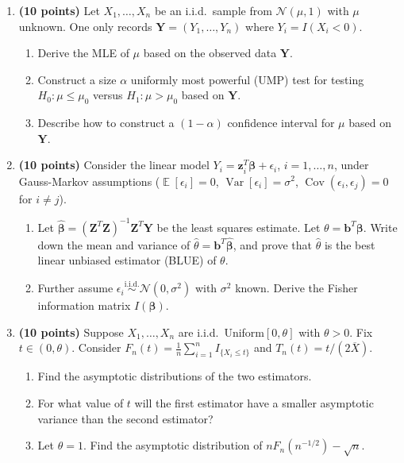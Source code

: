 \documentclass[11pt,a4paper]{article}
\DeclareMathOperator{\Var}{Var}
\DeclareMathOperator{\E}{\mathbb{E}}
\DeclareMathOperator{\Cov}{Cov}
\begin{document}
\begin{enumerate}[label=\textbf{\arabic*.}]
    \item \textbf{(10 points)} Let $X_1, \dots, X_n$ be an i.i.d.\ sample from $\mathcal{N}(\mu, 1)$ with $\mu$ unknown. One only records $\mathbf{Y} = (Y_1, \dots, Y_n)$ where $Y_i = I(X_i < 0)$.
    \begin{enumerate}[label=(\alph*)]
        \item Derive the MLE of $\mu$ based on the observed data $\mathbf{Y}$.
        \item Construct a size $\alpha$ uniformly most powerful (UMP) test for testing $H_0 : \mu \le \mu_0$ versus $H_1 : \mu > \mu_0$ based on $\mathbf{Y}$.
        \item Describe how to construct a $(1 - \alpha)$ confidence interval for $\mu$ based on $\mathbf{Y}$.
    \end{enumerate}

    \item \textbf{(10 points)} Consider the linear model $Y_i = \mathbf{z}_i^T \bm{\beta} + \epsilon_i$, $i = 1, \dots, n$, under Gauss-Markov assumptions ($\E[\epsilon_i] = 0$, $\Var[\epsilon_i] = \sigma^2$, $\Cov(\epsilon_i, \epsilon_j) = 0$ for $i \neq j$).
    \begin{enumerate}[label=(\alph*)]
        \item Let $\hat{\bm{\beta}} = (\mathbf{Z}^T \mathbf{Z})^{-1} \mathbf{Z}^T \mathbf{Y}$ be the least squares estimate. Let $\theta = \mathbf{b}^T \bm{\beta}$. Write down the mean and variance of $\hat{\theta} = \mathbf{b}^T \hat{\bm{\beta}}$, and prove that $\hat{\theta}$ is the best linear unbiased estimator (BLUE) of $\theta$.
        \item Further assume $\epsilon_i \stackrel{\text{i.i.d.}}{\sim} \mathcal{N}(0, \sigma^2)$ with $\sigma^2$ known. Derive the Fisher information matrix $I(\bm{\beta})$.
    \end{enumerate}

    \item \textbf{(10 points)} Suppose $X_1, \dots, X_n$ are i.i.d.\ Uniform$[0, \theta]$ with $\theta > 0$. Fix $t \in (0, \theta)$. Consider $F_n(t) = \frac{1}{n} \sum_{i=1}^n I_{\{X_i \le t\}}$ and $T_n(t) = t / (2\overline{X})$.
    \begin{enumerate}[label=(\alph*)]
        \item Find the asymptotic distributions of the two estimators.
        \item For what value of $t$ will the first estimator have a smaller asymptotic variance than the second estimator?
        \item Let $\theta = 1$. Find the asymptotic distribution of $n F_n(n^{-1/2}) - \sqrt{n}$.
    \end{enumerate}


\end{enumerate}
\end{document}

